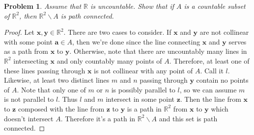 \documentclass{article}
\newtheorem{problem}{Problem}
\begin{document}
\begin{problem}
Assume that $\mathbb{R}$ is uncountable. Show that if $A$ is a countable subset of $\mathbb{R}^2$, then $\mathbb{R}^2 \backslash A$ is path connected.
\end{problem}
\begin{proof}
Let $\mathbf{x}, \mathbf{y} \in \mathbb{R}^2$. There are two cases to consider. If $\mathbf{x}$ and $\mathbf{y}$ are not collinear with some point $\mathbf{a} \in A$, then we're done since the line connecting $\mathbf{x}$ and $\mathbf{y}$ serves as a path from $\mathbf{x}$ to $\mathbf{y}$. Otherwise, note that there are uncountably many lines in $\mathbb{R}^2$ intersecting $\mathbf{x}$ and only countably many points of $A$. Therefore, at least one of these lines passing through $\mathbf{x}$ is not collinear with any point of $A$. Call it $l$. Likewise, at least two distinct lines $m$ and $n$ passing through $\mathbf{y}$ contain no points of $A$. Note that only one of $m$ or $n$ is possibly parallel to $l$, so we can assume $m$ is not parallel to $l$. Thus $l$ and $m$ intersect in some point $\mathbf{z}$. Then the line from $\mathbf{x}$ to $\mathbf{z}$ composed with the line from $\mathbf{z}$ to $\mathbf{y}$ is a path in $\mathbb{R}^2$ from $\mathbf{x}$ to $\mathbf{y}$ which doesn't intersect $A$. Therefore it's a path in $\mathbb{R}^2 \backslash A$ and this set is path connected.
\end{proof}
\end{document}
